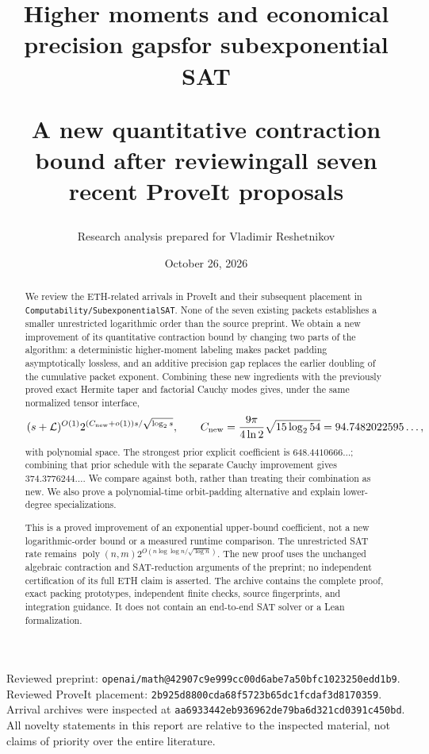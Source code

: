 \documentclass[11pt]{article}
\title{\vspace{-1em}\LARGE Higher moments and economical precision gaps\newline for subexponential SAT\par\vspace{.5em}\large A new quantitative contraction bound after reviewing\newline all seven recent ProveIt proposals}
\author{Research analysis prepared for Vladimir Reshetnikov}
\date{October 26, 2026}
\theoremstyle{remark}\newtheorem{remark}[theorem]{Remark}
\newcommand{\poly}{\operatorname{poly}}
\newcommand{\LL}{\mathcal L}
\newcommand{\Cnew}{C_{\rm new}}
\newcommand{\lp}{\log_2}
\begin{document}
\maketitle\thispagestyle{empty}
\begin{abstract}
We review the ETH-related arrivals in ProveIt and their subsequent placement in \texttt{Computability/SubexponentialSAT}. None of the seven existing packets establishes a smaller unrestricted logarithmic order than the source preprint. We obtain a new improvement of its quantitative contraction bound by changing two parts of the algorithm: a deterministic higher-moment labeling makes packet padding asymptotically lossless, and an additive precision gap replaces the earlier doubling of the cumulative packet exponent. Combining these new ingredients with the previously proved exact Hermite taper and factorial Cauchy modes gives, under the same normalized tensor interface,
\[
 (s+\LL)^{O(1)}
 2^{(\Cnew+o(1))s/\sqrt{\lp s}},\qquad
 \Cnew=\frac{9\pi}{4\ln2}\sqrt{15\lp54}
       =94.7482022595\ldots,
\]
with polynomial space. The strongest prior explicit coefficient is $648.4410666\ldots$; combining that prior schedule with the separate Cauchy improvement gives $374.3776244\ldots$. We compare against both, rather than treating their combination as new. We also prove a polynomial-time orbit-padding alternative and explain lower-degree specializations.

This is a proved improvement of an exponential upper-bound coefficient, not a new logarithmic-order bound or a measured runtime comparison. The unrestricted SAT rate remains $\poly(n,m)2^{O(n\log\log n/\sqrt{\log n})}$. The new proof uses the unchanged algebraic contraction and SAT-reduction arguments of the preprint; no independent certification of its full ETH claim is asserted. The archive contains the complete proof, exact packing prototypes, independent finite checks, source fingerprints, and integration guidance. It does not contain an end-to-end SAT solver or a Lean formalization.
\end{abstract}
\vfill
\small
Reviewed preprint: \texttt{openai/math@42907c9e999cc00d6abe7a50bfc1023250edd1b9}.\\
Reviewed ProveIt placement: \texttt{2b925d8800cda68f5723b65dc1fcdaf3d8170359}.\\
Arrival archives were inspected at \texttt{aa6933442eb936962de79ba6d321cd0391c450bd}.\\
All novelty statements in this report are relative to the inspected material, not claims of priority over the entire literature.
\clearpage\normalsize\tableofcontents\clearpage
\end{document}
